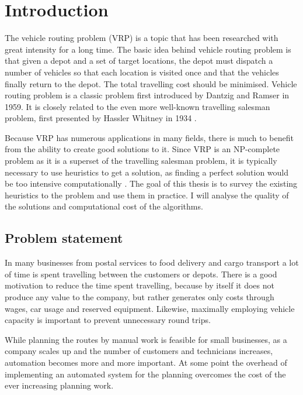 \chapter{Introduction}
\label{chapter:intro}

The vehicle routing problem (VRP) is a topic that has been researched with great intensity for a long time. The basic idea behind vehicle routing problem is that given a depot and a set of target locations, the depot must dispatch a number of vehicles so that each location is visited once and that the vehicles finally return to the depot. The total travelling cost should be minimised. Vehicle routing problem is a classic problem first introduced by Dantzig and Ramser in 1959. \cite{dantzig1959truck} It is closely related to the even more well-known travelling salesman problem, first presented by Hassler Whitney in 1934 \cite{flood1956traveling}. 

Because VRP has numerous applications in many fields, there is much to benefit from the ability to create good solutions to it. Since VRP is an NP-complete problem as it is a superset of the travelling salesman problem, it is typically necessary to use heuristics to get a solution, as finding a perfect solution would be too intensive computationally \cite{laporte2007you}. The goal of this thesis is to survey the existing heuristics to the problem and use them in practice. I will analyse the quality of the solutions and computational cost of the algorithms.

\section{Problem statement} 
In many businesses from postal services to food delivery and cargo transport a lot of time is spent travelling between the customers or depots. There is a good motivation to reduce the time spent travelling, because by itself it does not produce any value to the company, but rather generates only costs through wages, car usage and reserved equipment. Likewise, maximally employing vehicle capacity is important to prevent unnecessary round trips.  

While planning the routes by manual work is feasible for small businesses, as a company scales up and the number of customers and technicians increases, automation becomes more and more important. At some point the overhead of implementing an automated system for the planning overcomes the cost of the ever increasing planning work.

